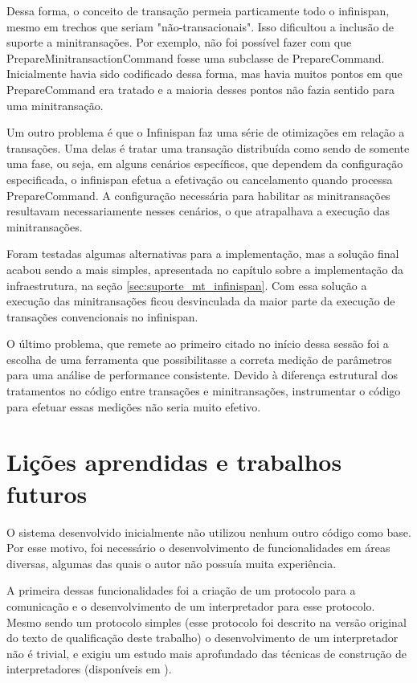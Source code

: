 \documentclass[11pt,twoside,a4paper]{book}
\begin{document}
Dessa forma, o conceito de transação permeia particamente todo o infinispan, mesmo em trechos que seriam "não-transacionais". Isso dificultou a inclusão de suporte a minitransações. Por exemplo, não foi possível fazer com que PrepareMinitransactionCommand fosse uma subclasse de PrepareCommand. Inicialmente havia sido codificado dessa forma, mas havia muitos pontos em que PrepareCommand era tratado e a maioria desses pontos não fazia sentido para uma minitransação.

Um outro problema é que o Infinispan faz uma série de otimizações em relação a transações. Uma delas é tratar uma transação distribuída como sendo de somente uma fase, ou seja, em alguns cenários específicos, que dependem da configuração especificada, o infinispan efetua a efetivação ou cancelamento quando processa PrepareCommand. A configuração necessária para habilitar as minitransações resultavam necessariamente nesses cenários, o que atrapalhava a execução das minitransações.

Foram testadas algumas alternativas para a implementação, mas a solução final acabou sendo a mais simples, apresentada no capítulo sobre a implementação da infraestrutura, na seção \ref{sec:suporte_mt_infinispan}. Com essa solução a execução das minitransações ficou desvinculada da maior parte da execução de transações convencionais no infinispan.

O último problema, que remete ao primeiro citado no início dessa sessão foi a escolha de uma ferramenta que possibilitasse a correta medição de parâmetros para uma análise de performance consistente. Devido à diferença estrutural dos tratamentos no código entre transações e minitransações, instrumentar o código para efetuar essas medições não seria muito efetivo.

\section{Lições aprendidas e trabalhos futuros}
\label{sec:licoes_e_futuro}

O sistema desenvolvido inicialmente não utilizou nenhum outro código como base. Por esse motivo, foi necessário o desenvolvimento de funcionalidades em áreas diversas, algumas das quais o autor não possuía muita experiência.

A primeira dessas funcionalidades foi a criação de um protocolo para a comunicação e o desenvolvimento de um interpretador para esse protocolo. Mesmo sendo um protocolo simples (esse protocolo foi descrito na versão original do texto de qualificação deste trabalho) o desenvolvimento de um interpretador não é trivial, e exigiu um estudo mais aprofundado das técnicas de construção de interpretadores (disponíveis em \cite{compilers}).
\end{document}
